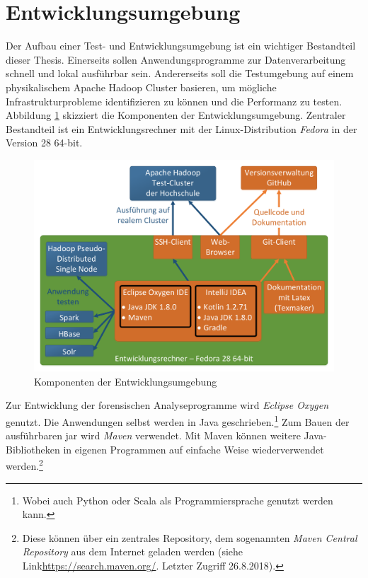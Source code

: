 \clearpage
\section{Entwicklungsumgebung}
\label{development_environment}
Der Aufbau einer Test- und Entwicklungsumgebung ist ein wichtiger Bestandteil dieser Thesis. Einerseits sollen Anwendungsprogramme zur Datenverarbeitung schnell und lokal ausführbar sein. Andererseits soll die Testumgebung auf einem physikalischem Apache Hadoop Cluster basieren, um mögliche Infrastrukturprobleme identifizieren zu können und die Performanz zu testen. \\

\noindent
Abbildung \ref{fig:development_environment} skizziert die Komponenten der Entwicklungsumgebung. Zentraler Bestandteil ist ein Entwicklungsrechner mit der Linux-Distribution \textit{Fedora} in der Version 28 64-bit.

\begin{figure}[ht]
  \centering
  \includegraphics[width=\textwidth]{./resource/development_environment.pdf}
  \caption{Komponenten der Entwicklungsumgebung}
  \label{fig:development_environment}
\end{figure} 

\noindent
Zur Entwicklung der forensischen Analyseprogramme wird \textit{Eclipse Oxygen} genutzt. Die Anwendungen selbst werden in Java geschrieben.\footnote{Wobei auch Python oder Scala als Programmiersprache genutzt werden kann.} Zum Bauen der ausführbaren \gls{jar} wird \textit{Maven} verwendet. Mit Maven können weitere Java-Bibliotheken 
in eigenen Programmen auf einfache Weise wiederverwendet werden.\footnote{Diese können über ein zentrales Repository, dem sogenannten \textit{Maven Central Repository} aus dem Internet geladen werden (siehe Link\url{https://search.maven.org/}. Letzter Zugriff 26.8.2018).}\\

